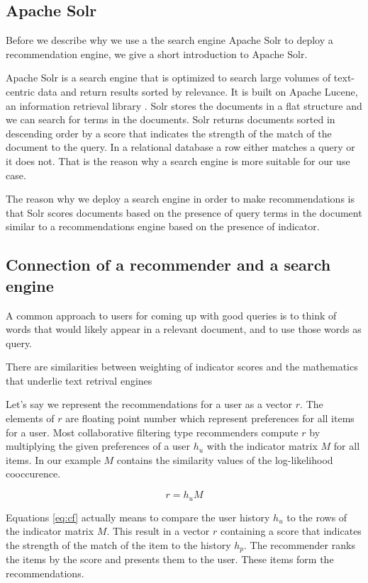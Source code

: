 \subsection{Apache Solr}
\label{sec:solr}

Before we describe why we use a the search engine Apache Solr to deploy a recommendation engine, we give a short introduction to Apache Solr.

Apache Solr is a search engine that is optimized to search large volumes of text-centric data and return results sorted by relevance. It is built on Apache Lucene, an information retrieval library \cite{grainger}. Solr stores the documents in a flat structure and we can search for terms in the documents.
Solr returns documents sorted in descending order by a score that indicates the strength of the match of the document to the query. In a relational database a row either matches a query or it does not. That is the reason why a search engine is more suitable for our use case.

The reason why we deploy a search engine in order to make recommendations is that Solr scores documents based on the presence of query terms in the document similar to a recommendations engine based on the presence of indicator.

\subsection{Connection of a recommender and a search engine}
\label{sec:relation}

A common approach to users for coming up with good queries is to think of words that would likely appear in a relevant document, and to use those words as query.

There are similarities between weighting of indicator scores and the mathematics that underlie text retrival engines

Let's say we represent the recommendations for a user as a vector $r$. The elements of $r$ are floating point number which represent preferences for all items for a user. Most collaborative filtering type recommenders compute $r$ by multiplying the given preferences of a user $h_u$ with the indicator matrix $M$ for all items. In our example $M$ contains the similarity values of the log-likelihood cooccurence.

\begin{equation}
  \label{eq:cf}
  r = h_u M
\end{equation}

Equations \ref{eq:cf} actually means to compare the user history $h_u$ to the rows of the indicator matrix $M$. This result in a vector $r$ containing a score that indicates the strength of the match of the item to the history $h_p$. The recommender ranks the items by the score and presents them to the user. These items form the recommendations.

